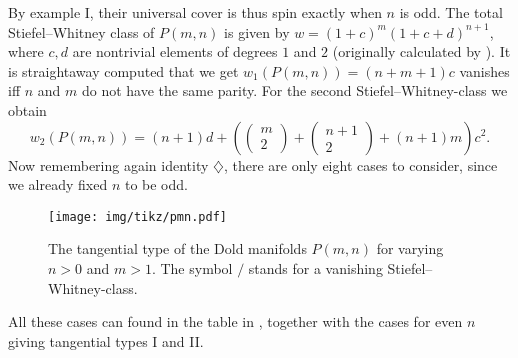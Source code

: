        By example I, their universal cover is thus spin exactly when $n$ is odd. 
        The total Stiefel--Whitney class of $P(m,n)$ is given by $w = (1+c)^m(1+c+d)^{n+1}$, where $c,d$ are nontrivial elements of degrees $1$ and $2$ (originally calculated by \cite{dold:bord}).
        It is straightaway computed that we get $ w_1(P(m,n)) = (n + m + 1)c$  vanishes iff $n$ and $m$ do not have the same parity.
        For the second Stiefel--Whitney-class we obtain
        \begin{equation*}
                w_2(P(m,n)) = (n+1)d + \left(\begin{pmatrix} m\\ 2 \end{pmatrix} + \begin{pmatrix} n +1 \\ 2\end{pmatrix} + (n+1)m\right)c^2.
        \end{equation*}
        Now remembering again identity $\diamondsuit$, there are only eight cases to consider, since we already fixed $n$ to be odd.
        \begin{sidewaysfigure}
            \centering
            \texttt{[image: img/tikz/pmn.pdf]}
            \caption{The tangential type of the Dold manifolds $P(m,n)$ for varying $n>0$ and $m>1$. The symbol $/$ stands for a vanishing Stiefel--Whitney-class.}\label{fig:pmn}
        \end{sidewaysfigure}
        All these cases can found in the table in , together with the cases for even $n$ giving tangential types I and II. \\
